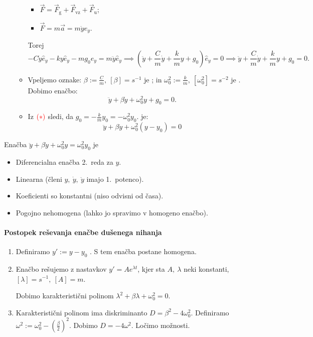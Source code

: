 \begin{enumerate}
\begin{itemize}
        \begin{itemize}
            \item \(\vec{F} = \vec{F}_\text{g} + \vec{F}_\text{vz} + \vec{F}_\text{u}\);
            \item \(\vec{F} = m \vec{a} = m \ddot{y} \widehat{e}_y\).
        \end{itemize}
        Torej 
        \[
        -C \dot{y} \widehat{e}_y - ky\widehat{e}_y -mg_0 \widehat{e}_y = m \ddot{y} \widehat{e}_y \implies 
        \left( \ddot{y} + \frac{C}{m} \dot{y} + \frac{k}{m} y + g_0 \right) \widehat{e}_y = 0 \implies 
        \ddot{y} + \frac{C}{m} \dot{y} + \frac{k}{m} y + g_0 = 0.
        \]
        \item Vpeljemo oznake: \(\beta := \frac{C}{m}, \ [\beta]  = s^{-1}\) je ; in \( \omega_0^2 := \frac{k}{m}, \ [\omega_0^2] = s^{-2}\) je . Dobimo enačbo:
        \[
        \ddot{y} + \beta \dot{y} + \omega_0^2 y + g_0 = 0.
        \]
        \item Iz \(\textcolor{red}{(*)}\) sledi, da \(g_0 = -\frac{k}{m}y_0 = - \omega_0^2y_0\).  
         je:
        \[
        \boxed{\ddot{y} + \beta \dot{y} +  \omega_0^2 (y - y_0) = 0}
        \]        
    \end{itemize}
\end{enumerate}

\begin{opomba}
    Enačba \(\ddot{y} + \beta \dot{y} + \omega_0^2y = \omega_0^2 y_0\) je 
    \begin{itemize}
        \item Diferencialna enačba 2.\ reda za \(y\).
        \item Linearna (členi \(y, \ \dot{y}, \ \ddot{y}\) imajo 1.\ potenco).
        \item Koeficienti so konstantni (niso odvisni od časa).
        \item Pogojno nehomogena (lahko jo spravimo v homogeno enačbo).
    \end{itemize}
\end{opomba}

\paragraph{Postopek reševanja enačbe dušenega nihanja}
\begin{enumerate}
    \item Definiramo \(y' := y - y_0\) . S tem enačba postane homogena.
    \item Enačbo rešujemo z nastavkov \(y' = A e^{\lambda t}\), kjer sta \(A, \ \lambda\) neki konstanti, \([\lambda] = s^{-1}, \ [A] = m\). 
    
    Dobimo karakteristični polinom \(\lambda^2 + \beta \lambda + \omega_0^2 = 0\).
    \item Karakteristični polinom ima diskriminanto \(D = \beta^2 - 4 \omega_0^2\). Definiramo \(\boxed{\omega^2 := \omega_0^2 - \left(\frac{\beta}{2}\right)^2}\). Dobimo \(D = - 4 \omega^2\). Ločimo možnosti.
\end{enumerate}

